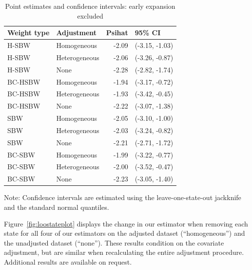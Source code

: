 \begin{table}[h!]
\centering
\begin{threeparttable}
\caption{Point estimates and confidence intervals: early expansion excluded}
\label{tab:confintmainc2}
\begin{tabular}{llrl}
  \hline
Weight type & Adjustment & Psihat & 95\% CI \\ 
  \hline
H-SBW & Homogeneous & -2.09 & (-3.15, -1.03) \\ 
  H-SBW & Heterogeneous & -2.06 & (-3.26, -0.87) \\ 
  H-SBW & None & -2.28 & (-2.82, -1.74) \\ 
  BC-HSBW & Homogeneous & -1.94 & (-3.17, -0.72) \\ 
  BC-HSBW & Heterogeneous & -1.93 & (-3.42, -0.45) \\ 
  BC-HSBW & None & -2.22 & (-3.07, -1.38) \\ 
  SBW & Homogeneous & -2.05 & (-3.10, -1.00) \\ 
  SBW & Heterogeneous & -2.03 & (-3.24, -0.82) \\ 
  SBW & None & -2.21 & (-2.71, -1.72) \\ 
  BC-SBW & Homogeneous & -1.99 & (-3.22, -0.77) \\ 
  BC-SBW & Heterogeneous & -2.00 & (-3.52, -0.47) \\ 
  BC-SBW & None & -2.23 & (-3.05, -1.40) \\ 
   \hline
\end{tabular}
    \begin{tablenotes}
      \item[] Note: Confidence intervals are estimated using the leave-one-state-out jackknife and the standard normal quantiles.
    \end{tablenotes}
\end{threeparttable}
\end{table}

Figure~\ref{fig:loostateplot} displays the change in our estimator when removing each state for all four of our estimators on the adjusted dataset (``homogeneous'') and the unadjusted dataset (``none''). These results condition on the covariate adjustment, but are similar when recalculating the entire adjustment procedure. Additional results are available on request.

